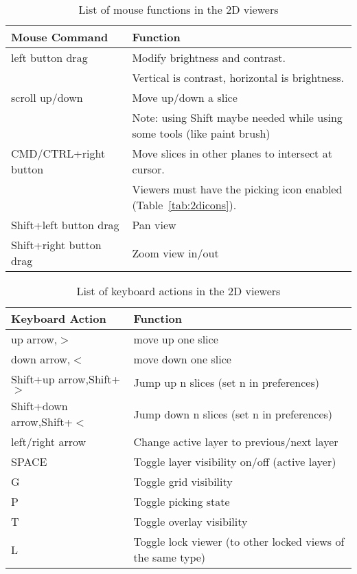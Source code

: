\documentclass[fleqn,11pt,openany]{book}
\begin{document}
\begin{table}[h!]
\label{tab:2dmouse}
\caption{List of mouse functions in the 2D viewers}
\begin{tabular}{|l|l|}
\hline
{\bf Mouse Command} & {\bf Function}\\
\hline
left button drag & Modify brightness and contrast.  \\ &Vertical is contrast, horizontal is brightness. \\
\hline 
scroll up/down & Move up/down a slice\\ &Note: using Shift maybe needed while using some tools (like paint brush)\\
\hline
CMD/CTRL+right button & Move slices in other planes to intersect at cursor.\\  &Viewers must have the picking icon enabled (Table~\ref{tab:2dicons}).\\
\hline
Shift+left button drag & Pan view\\
Shift+right button drag & Zoom view in/out\\
\hline
\end{tabular}
\end{table}

\begin{table}[h!]
\label{tab:2dkey}
\caption{List of keyboard actions in the 2D viewers}
\begin{tabular}{|l|l|}
\hline
{\bf Keyboard Action} & {\bf Function}\\
\hline
up arrow,$>$ & move up one slice\\
down arrow,$<$ & move down one slice\\
\hline
Shift+up arrow,Shift+$>$ & Jump up n slices (set n in preferences)\\
Shift+down arrow,Shift+$<$ & Jump down n slices (set n in preferences)\\
\hline
left/right arrow & Change active layer to previous/next layer\\
\hline
SPACE & Toggle layer visibility on/off (active layer)\\
\hline
G & Toggle grid visibility\\
\hline
P & Toggle picking state\\
\hline
T & Toggle overlay visibility\\
\hline
L & Toggle lock viewer (to other locked views of the same type)\\
\hline
\end{tabular}
\end{table}
\end{document}

